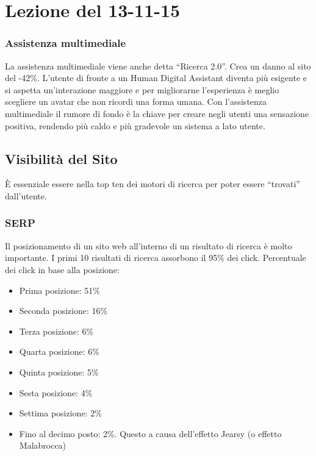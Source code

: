 \section{Lezione del 13-11-15}

\subsubsection{Assistenza multimediale}

La assistenza multimediale viene anche detta ``Ricerca 2.0''. Crea un danno al sito del -42\%. L'utente di fronte a un Human Digital Assistant diventa pi\`u esigente e si aspetta un'interazione maggiore e per migliorarne l'esperienza \`e meglio scegliere un avatar che non ricordi una forma umana.
Con l'assistenza multimediale il rumore di fondo \`e la chiave per creare negli utenti una sensazione positiva, rendendo pi\`u caldo e pi\`u gradevole un sistema a lato utente.

\subsection{Visibilit\`a del Sito}

\`E essenziale essere nella top ten dei motori di ricerca per poter essere ``trovati'' dall'utente.

\subsubsection{SERP}

Il posizionamento di un sito web all'interno di un risultato di ricerca \`e molto importante. I primi 10 risultati di ricerca assorbono il 95\% dei click.
Percentuale dei click in base alla posizione:
\begin{itemize}

\item Prima posizione: 51\%
\item Seconda posizione: 16\%
\item Terza posizione: 6\%
\item Quarta posizione: 6\%
\item Quinta posizione: 5\%
\item Sesta posizione: 4\%
\item Settima posizione: 2\%
\item Fino al decimo posto: 2\%. Questo a causa dell'effetto Jearsy (o effetto Malabrocca)

\end{itemize}


